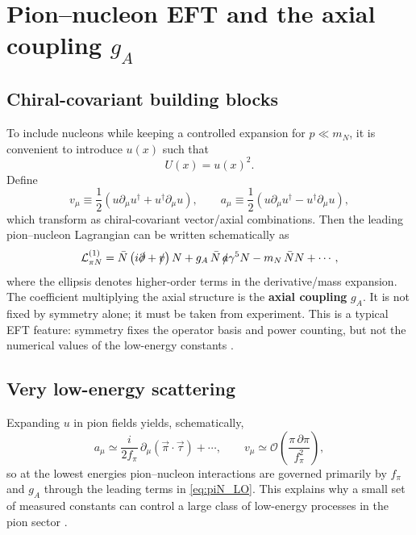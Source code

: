 \section{Pion--nucleon EFT and the axial coupling $g_A$}

\subsection{Chiral-covariant building blocks}

To include nucleons while keeping a controlled expansion for $p\ll m_N$,
it is convenient to introduce $u(x)$ such that
\begin{equation}
U(x)=u(x)^2.
\end{equation}
Define
\begin{equation}
v_\mu \equiv \frac12\left(u\partial_\mu u^\dagger + u^\dagger\partial_\mu u\right),
\qquad
a_\mu \equiv \frac12\left(u\partial_\mu u^\dagger - u^\dagger\partial_\mu u\right),
\label{eq:va_def}
\end{equation}
which transform as chiral-covariant vector/axial combinations.
Then the leading pion--nucleon Lagrangian can be written schematically as
\begin{equation}
\mathcal{L}_{\pi N}^{(1)}
=
\bar N\left(i\slashed{\partial}+\slashed{v}\right)N
+ g_A\,\bar N\,\slashed{a}\gamma^5 N
- m_N\,\bar N N
+ \cdots,
\label{eq:piN_LO}
\end{equation}
where the ellipsis denotes higher-order terms in the derivative/mass expansion.
The coefficient multiplying the axial structure is the \textbf{axial coupling} $g_A$.
It is not fixed by symmetry alone; it must be taken from experiment.
This is a typical EFT feature: symmetry fixes the operator basis and power counting,
but not the numerical values of the low-energy constants
\citep{donoghue1992,schwartz2014,thomson2013}.

\subsection{Very low-energy scattering}

Expanding $u$ in pion fields yields, schematically,
\begin{equation}
a_\mu \simeq \frac{i}{2f_\pi}\,\partial_\mu(\vec\pi\cdot\vec\tau) + \cdots,
\qquad
v_\mu \simeq \mathcal{O}\!\left(\frac{\pi\,\partial\pi}{f_\pi^2}\right),
\end{equation}
so at the lowest energies pion--nucleon interactions are governed primarily by
$f_\pi$ and $g_A$ through the leading terms in \eqref{eq:piN_LO}.
This explains why a small set of measured constants can control a large class of
low-energy processes in the pion sector \citep{donoghue1992,schwartz2014}.

